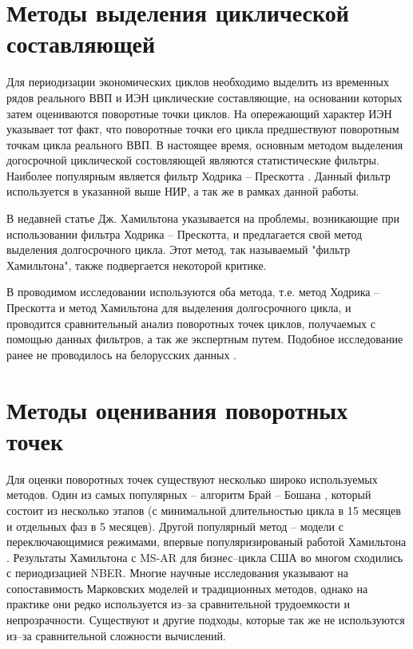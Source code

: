 \documentclass[../report.tex]{subfiles}
\begin{document}
	
	\section{Методы выделения циклической составляющей}
	
	Для периодизации экономических циклов необходимо выделить из временных рядов реального ВВП и ИЭН циклические составляющие, на основании которых затем оцениваются поворотные точки циклов. На опережающий характер ИЭН указывает тот факт, что поворотные точки его цикла предшествуют поворотным точкам цикла реального ВВП. В настоящее время, основным методом выделения догосрочной циклической состовляющей являются статистические фильтры. Наиболее популярным является фильтр Ходрика – Прескотта \cite{oecdCycleExtraction,estrellaFilterDo}. Данный фильтр используется в указанной выше НИР, а так же в рамках данной работы. 
	
	В недавней статье Дж. Хамильтона \cite{hamHP} указывается на проблемы, возникающие при использовании фильтра Ходрика – Прескотта, и предлагается свой метод выделения долгосрочного цикла. Этот метод, так называемый "фильтр Хамильтона", также подвергается некоторой критике.
	
	В проводимом исследовании используются оба метода, т.е. метод Ходрика – Прескотта и метод Хамильтона для выделения долгосрочного цикла, и проводится сравнительный анализ поворотных точек циклов, получаемых с помощью данных фильтров, а так же экспертным путем. Подобное исследование ранее не проводилось на белорусских данных \cite{makarevich_bsu_conf_2017}.
	
	
	\section{Методы оценивания поворотных точек}
	
	Для оценки поворотных точек существуют несколько широко используемых методов. Один из самых популярных – алгоритм Брай – Бошана \cite{bryCyclicalAnalysis}, который состоит из несколько этапов (с минимальной длительностью цикла в 15 месяцев и отдельных фаз в 5 месяцев). Другой популярный метод – модели с переключающимися режимами, впервые популяризированый работой Хамильтона \cite{hamNewApproach}. Результаты Хамильтона с MS-AR для бизнес–цикла США во многом сходились с периодизацией NBER. Многие научные исследования \cite{bodmanCanada,brunoItaly,hardingTwoMethods} указывают на сопоставимость Марковских моделей и традиционных методов, однако на практике они редко используется из–за сравнительной трудоемкости и непрозрачности. Существуют и другие подходы, которые так же не используются из–за сравнительной сложности вычислений.
	
\end{document}
